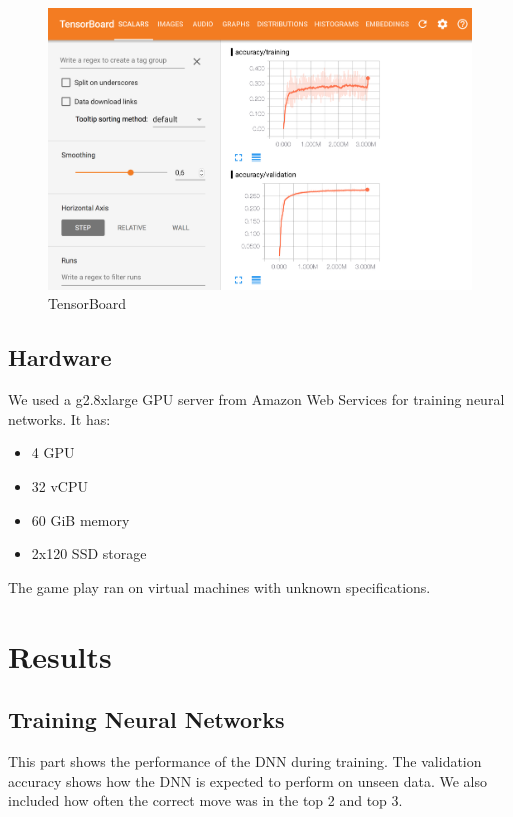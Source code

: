 \documentclass{kththesis}
\begin{document}
\begin{figure}
\centering
\includegraphics[width=\textwidth]{images/tensorboard.png}
\caption{TensorBoard}
\label{fig:tensorboard}
\end{figure}

\section{Hardware}
We used a g2.8xlarge GPU server from Amazon Web Services for training neural networks.
It has:
\begin{itemize}
\item  4 GPU
\item 32 vCPU
\item 60 GiB memory
\item  2x120 SSD storage
\end{itemize}

The game play ran on virtual machines with unknown specifications.




\chapter{Results}

\section{Training Neural Networks}
This part shows the performance of the DNN during training. The validation accuracy shows how the DNN is expected to perform on unseen data. We also included how often the correct move was in the top 2 and top 3.
\end{document}

